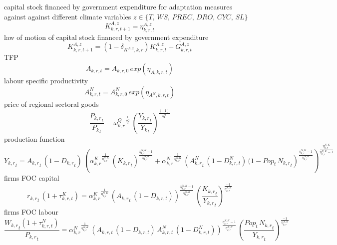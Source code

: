capital stock financed by government expenditure for adaptation measures against against different climate variables $z \in \{T,\, WS,\, PREC, \, DRO,\, CYC,\, SL\}$
\begin{dmath}
K^{A,z}_{k,r,t+1}=\eta^{A,z}_{k,r,t}
\end{dmath}
law of motion of capital stock financed by government expenditure
\begin{dmath}
K^{A,z}_{k,r,t+1}= (1 - \delta_{K^{A,z},k,r}) K^{A,z}_{k,r,t} + G^{A,z}_{k,r,t}
\end{dmath}
TFP
\begin{dmath}
A_{k,r,t}= A_{k,r,0} \, exp\left({\eta_{A,k,r,t}}\right)
\end{dmath}
labour specific productivity
\begin{dmath}
A^{N}_{k,r,t}= A^{N}_{k,r,0} \, exp\left({\eta_{A^{N},k,r,t}}\right)
\end{dmath}
price of regional sectoral goods
\begin{dmath}
\frac{{{P_{k,r}}_{t}}}{{{P_k}_{t}}}={{\omega^{Q}_{k,r}}}^{\frac{1}{{{\eta^{Q}_{k}}}}}\, \left(\frac{{{Y_{k,r}}_{t}}}{{{Y_k}_{t}}}\right)^{\frac{\left(-1\right)}{{{\eta^{Q}_{k}}}}}
\end{dmath}
production function
\begin{dmath}
{{Y_{k,r}}_{t}}={{A_{k,r}}_{t}}\, \left(1-{{D_{k,r}}_{t}}\right)\, \left({{\alpha^{K}_{k,r}}}^{\frac{1}{{{\eta^{N,K}_{k,r}}}}}\, \left({{K_{k,r}}_{t}}\right)^{\frac{{{\eta^{N,K}_{k,r}}}-1}{{{\eta^{N,K}_{k,r}}}}}+{{\alpha^{N}_{k,r}}}^{\frac{1}{{{\eta^{N,K}_{k,r}}}}}\, \left({{A^{N}_{k,r}}_{t}} \, (1 - D^{N}_{k,r,t}) \, (1 -  {Pop_{t}}\, {{N_{k,r}}_{t}}\right)^{\frac{{{\eta^{N,K}_{k,r}}}-1}{{{\eta^{N,K}_{k,r}}}}}\right)^{\frac{{{\eta^{N,K}_{k,r}}}}{{{\eta^{N,K}_{k,r}}}-1}}
\end{dmath}
firms FOC capital
\begin{dmath}
{{r_{k,r}}_{t}} \, \left(1+\tau^{K}_{k,r,t}\right)={{\alpha^{K}_{k,r}}}^{\frac{1}{{{\eta^{N,K}_{k,r}}}}}\, \left({A_{k,r}}_{t} \, (1 - D_{k,r,t})\right)^{\frac{{{\eta^{N,K}_{k,r}}}-1}{{{\eta^{N,K}_{k,r}}}}}\, \left(\frac{{{K_{k,r}}_{t}}}{{{Y_{k,r}}_{t}}}\right)^{\frac{-1}{{{\eta^{N,K}_{k,r}}}}}
\end{dmath}
firms FOC labour
\begin{dmath}
\frac{{{W_{k,r}}_{t}}\left(1+\tau^{N}_{k,r,t}\right)}{{{P_{k,r}}_{t}}}={{\alpha^{N}_{k,r}}}^{\frac{1}{{{\eta^{N,K}_{k,r}}}}}\, \left(A_{k,r,t} \, (1 - D_{k,r,t}) \, A^{N}_{k,r,t} \, (1 - D^{N}_{k,r,t})\right)^{\frac{\eta^{N,K}_{k,r}-1}{\eta^{N,K}_{k,r}}} \, \left(\frac{{Pop_{t}}\, {{N_{k,r}}_{t}}}{{{Y_{k,r}}_{t}}}\right)^{\frac{-1}{{{\eta^{N,K}_{k,r}}}}}
\end{dmath}

